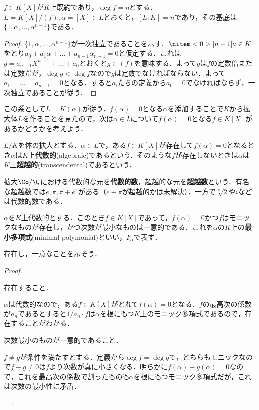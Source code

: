 \begin{prop}\label{prop:既約多項式の商による拡大}
	$f\in K[X]$が$K$上既約であり，$\deg f=n$とする．$L=K[X]/(f),\alpha=[X]\in L$とおくと，$[L:K]=n$であり，その基底は$\{1,\alpha,\dots,\alpha^{n-1}\}$である．
\end{prop}

\begin{proof}
	$\{1,\alpha,\dots,\alpha^{n-1}\}$が一次独立であることを示す．$\nitem<0>[n-1]{a}\in K$をとり$a_0+a_1\alpha+\dots+a_{n-1}\alpha_{n-1}=0$と仮定する．これは$g=a_{n-1}X^{n-1}+\dots+a_0$とおくと$g\in (f)$を意味する．よって$g$は$f$の定数倍または定数だが，$\deg g<\deg f$なので$g$は定数でなければならない．よって$a_1=\dots=a_{n-1}=0$となる．すると$a_i$たちの定義から$a_0=0$でなければならず，一次独立であることが従う．
\end{proof}

この系として$L= K(\alpha)$が従う．$f(\alpha)=0$となる$\alpha$を添加することで$K$から拡大体$L$を作ることを見たので，次は$\alpha\in L$について$f(\alpha)=0$となる$f\in K[X]$があるかどうかを考えよう．

\begin{defi}[代数的]
	$L/K$を体の拡大とする．$\alpha\in L$で，ある$f\in K[X]$が存在して$f(\alpha)=0$となるとき$\alpha$は$K$上\textbf{代数的}(algebraic)であるという．そのような$f$が存在しないときは$\alpha$は$K$上\textbf{超越的}(transcendental)であるという．
\end{defi}

拡大$\Co/\Q$における代数的な元を\textbf{代数的数}，超越的な元を\textbf{超越数}という．有名な超越数では$e,\pi,\pi+e^\pi$がある（$e+\pi$が超越的かは未解決）．一方で$\sqrt[n]{2}$や$i$などは代数的数である．

\begin{defi}[最小多項式]
	$\alpha$を$K$上代数的とする．このとき$f\in K[X]$であって，$f(\alpha)=0$かつ$f$はモニックなものが存在し，かつ次数が最小なものは一意的である．これを$\alpha$の$K$上の\textbf{最小多項式}(minimal polymonial)といい，$F_\alpha$で表す．
\end{defi}

存在し，一意なことを示そう．
\begin{proof}
	\begin{step}
		\item 存在すること．
		
		$\alpha$は代数的なので，ある$f\in K[X]$がとれて$f(\alpha)=0$となる．$f$の最高次の係数が$a_n$であるとすると$1/a_n\cdot f$は$\alpha$を根にもつ$K$上のモニック多項式であるので，存在することがわかる．
		
		\item 次数最小のものが一意的であること．
		
		$f\neq g$が条件を満たすとする．定義から$\deg f=\deg g$で，どちらもモニックなので$f-g\neq0 $は$f$より次数が真に小さくなる．明らかに$f(\alpha)-g(\alpha)=0$なので，これを最高次の係数で割ったものも$\alpha$を根にもつモニック多項式だが，これは次数の最小性に矛盾．
	\end{step}
\end{proof}


